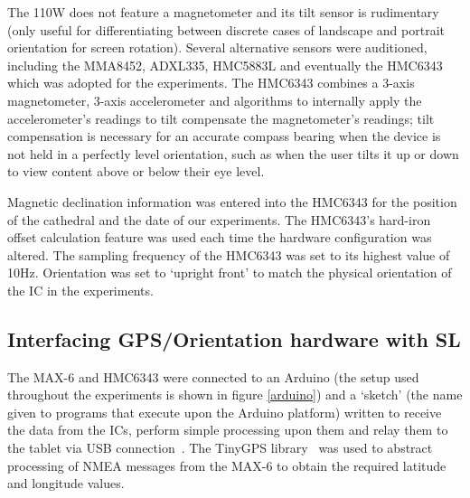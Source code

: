 The 110W does not feature a magnetometer and its tilt sensor is rudimentary (only useful for differentiating between discrete cases of landscape and portrait orientation for screen rotation). Several alternative sensors were auditioned, including the MMA8452, ADXL335, HMC5883L and eventually the HMC6343 which was adopted for the experiments. The HMC6343 combines a 3-axis magnetometer, 3-axis accelerometer and algorithms to internally apply the accelerometer's readings to tilt compensate the magnetometer's readings; tilt compensation is necessary for an accurate compass bearing when the device is not held in a perfectly level orientation, such as when the user tilts it up or down to view content above or below their eye level.

Magnetic declination information was entered into the HMC6343 for the position of the cathedral and the date of our experiments. The HMC6343's hard-iron offset calculation feature was used each time the hardware configuration was altered. The sampling frequency of the HMC6343 was set to its highest value of 10Hz. Orientation was set to `upright front' to match the physical orientation of the IC in the experiments.

\subsection{Interfacing GPS/Orientation hardware with SL}
The MAX-6 and HMC6343 were connected to an Arduino (the setup used throughout the experiments is shown in figure \ref{arduino}) and a `sketch' (the name given to programs that execute upon the Arduino platform) written to receive the data from the ICs, perform simple processing upon them and relay them to the tablet via USB connection~\cite{Davies}. The TinyGPS library~\cite{Hart} was used to abstract processing of NMEA messages from the MAX-6 to obtain the required latitude and longitude values.
 


